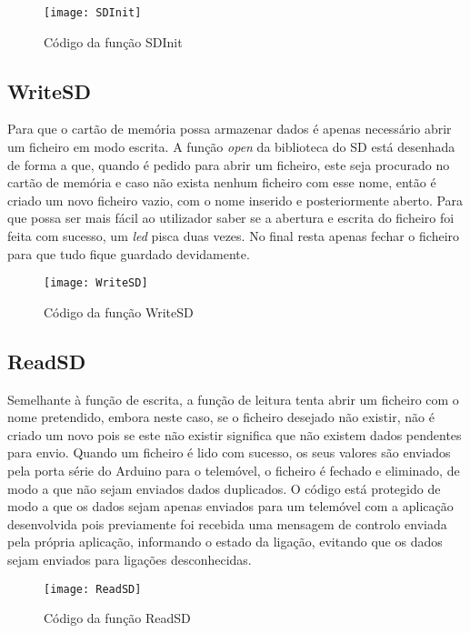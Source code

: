 \begin{figure}[hbtp]
	\centering
	\texttt{[image: SDInit]}
	\caption{Código da função SDInit}
	\label{fig:SDInit}
\end{figure}

\subsection{WriteSD}
\label{sub:writesd}

Para que o cartão de memória possa armazenar dados é apenas necessário abrir um ficheiro em modo escrita.
A função \emph{open} da biblioteca do SD está desenhada de forma a que, quando é pedido para abrir um ficheiro, este seja procurado no cartão de memória e caso não exista nenhum ficheiro com esse nome, então é criado um novo ficheiro vazio, com o nome inserido e posteriormente aberto.
Para que possa ser mais fácil ao utilizador saber se a abertura e escrita do ficheiro foi feita com sucesso, um \emph{led} pisca duas vezes.
No final resta apenas fechar o ficheiro para que tudo fique guardado devidamente.

\begin{figure}[hbtp]
	\centering
	\texttt{[image: WriteSD]}
	\caption{Código da função WriteSD}
	\label{fig:WriteSD}
\end{figure}

\subsection{ReadSD}
\label{sub:readsd}

Semelhante à função de escrita, a função de leitura tenta abrir um ficheiro com o nome pretendido, embora neste caso, se o ficheiro desejado não existir, não é criado um novo pois se este não existir significa que não existem dados pendentes para envio.
Quando um ficheiro é lido com sucesso, os seus valores são enviados pela porta série do Arduino para o telemóvel, o ficheiro é fechado e eliminado, de modo a que não sejam enviados dados duplicados.
O código está protegido de modo a que os dados sejam apenas enviados para um telemóvel com a aplicação desenvolvida pois previamente foi recebida uma mensagem de controlo enviada pela própria aplicação, informando o estado da ligação, evitando que os dados sejam enviados para ligações desconhecidas.

\begin{figure}[!hbtp]
	\centering
	\texttt{[image: ReadSD]}
	\caption{Código da função ReadSD}
	\label{fig:ReadSD}
\end{figure}

